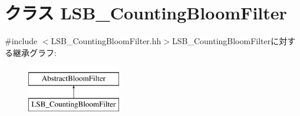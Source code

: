 \hypertarget{classLSB__CountingBloomFilter}{
\section{クラス LSB\_\-CountingBloomFilter}
\label{classLSB__CountingBloomFilter}
}


{\ttfamily \#include $<$LSB\_\-CountingBloomFilter.hh$>$}LSB\_\-CountingBloomFilterに対する継承グラフ:\begin{figure}[H]
\begin{center}
\leavevmode
\includegraphics[height=2cm]{classLSB__CountingBloomFilter}
\end{center}
\end{figure}
